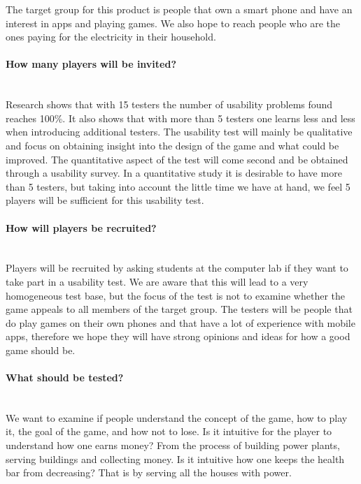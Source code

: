 		The target group for this product is people that own a smart phone and have an interest in apps and playing games. We also hope to reach people who are the ones paying for the electricity in their household. 

	\paragraph{How many players will be invited?}\mbox{}\\

		Research shows that with 15 testers the number of usability problems found reaches 100\%. \cite{numberOfUsers} It also shows that with more than 5 testers one learns less and less when introducing additional testers. The usability test will mainly be qualitative and focus on obtaining insight into the design of the game and what could be improved. The quantitative aspect of the test will come second and be obtained through a usability survey. In a quantitative study it is desirable to have more than 5 testers, but taking into account the little time we have at hand, we feel 5 players will be sufficient for this usability test.

	\paragraph{How will players be recruited?}\mbox{}\\

		Players will be recruited by asking students at the computer lab if they want to take part in a usability test. We are aware that this will lead to a very homogeneous test base, but the focus of the test is not to examine whether the game appeals to all members of the target group. The testers will be people that do play games on their own phones and that have a lot of experience with mobile apps, therefore we hope they will have strong opinions and ideas for how a good game should be.

	\paragraph{What should be tested?}\mbox{}\\

		We want to examine if people understand the concept of the game, how to play it, the goal of the game, 
		and how not to lose. Is it intuitive for the player to understand how one earns money? From the process 
		of building power plants, serving buildings and collecting money. Is it intuitive how one keeps 
		the health bar from decreasing? That is by serving all the houses with power.


